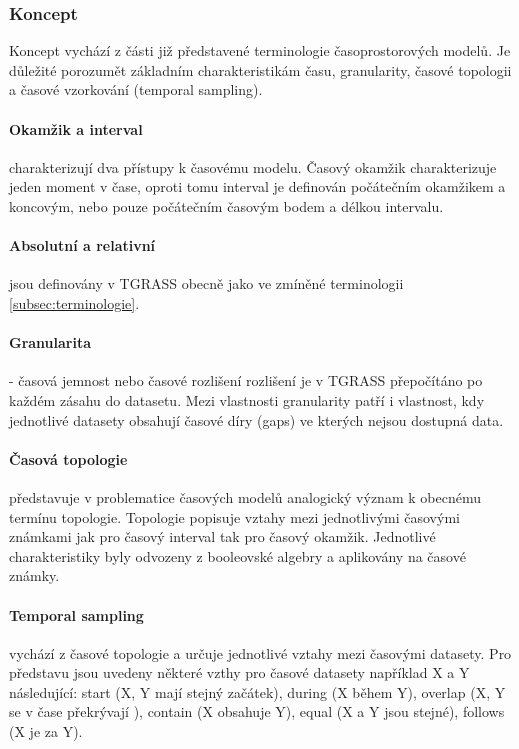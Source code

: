 \documentclass[a4paper,12pt,oneside]{report}
\begin{document}
\subsubsection{Koncept} 
Koncept vychází z části již představené terminologie časoprostorových modelů. Je důležité porozumět základním charakteristikám času, granularity, časové topologii a časové vzorkování (temporal sampling). 

\paragraph*{Okamžik a interval} charakterizují dva přístupy k časovému modelu.  Časový okamžik charakterizuje jeden moment v čase, oproti tomu interval je definován počátečním okamžikem a koncovým, nebo pouze počátečním časovým bodem a délkou intervalu. 

\paragraph*{Absolutní a relativní} jsou definovány v TGRASS obecně jako ve zmíněné terminologii \ref{subsec:terminologie}.

\paragraph*{Granularita}- časová jemnost nebo časové rozlišení rozlišení je v TGRASS přepočítáno po každém zásahu do datasetu. Mezi vlastnosti granularity patří i vlastnost, kdy jednotlivé datasety  obsahují časové díry (gaps) ve kterých nejsou dostupná data.  


\paragraph*{Časová topologie}  představuje v problematice časových modelů analogický význam k obecnému termínu topologie. Topologie popisuje vztahy mezi jednotlivými časovými známkami jak pro časový interval tak pro časový okamžik. Jednotlivé charakteristiky byly odvozeny z booleovské algebry a aplikovány na časové známky.

\paragraph*{Temporal sampling} vychází  z časové topologie a určuje jednotlivé vztahy mezi časovými datasety. Pro představu jsou uvedeny některé vzthy pro časové datasety například X a Y  následující: start (X, Y mají stejný začátek), during (X během Y), overlap (X, Y se v čase překrývají ), contain (X obsahuje Y), equal (X a Y jsou stejné), follows (X je za Y).
\end{document}

